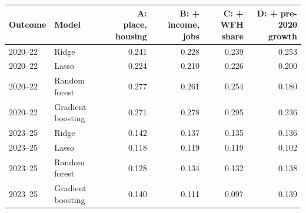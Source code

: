 \footnotesize\setlength{\tabcolsep}{4pt}
\begin{tabular}{llrrrr}
\toprule
Outcome & Model & \shortstack[r]{A: place,\\housing} & \shortstack[r]{B: + income,\\jobs} & \shortstack[r]{C: + WFH\\share} & \shortstack[r]{D: + pre-2020\\growth} \\
\midrule
2020--22 & Ridge & 0.241 & 0.228 & 0.239 & 0.253 \\
2020--22 & Lasso & 0.224 & 0.210 & 0.226 & 0.200 \\
2020--22 & Random forest & 0.277 & 0.261 & 0.254 & 0.180 \\
2020--22 & Gradient boosting & 0.271 & 0.278 & 0.295 & 0.236 \\
2023--25 & Ridge & 0.142 & 0.137 & 0.135 & 0.136 \\
2023--25 & Lasso & 0.118 & 0.119 & 0.119 & 0.102 \\
2023--25 & Random forest & 0.128 & 0.134 & 0.132 & 0.138 \\
2023--25 & Gradient boosting & 0.140 & 0.111 & 0.097 & 0.139 \\
\bottomrule
\end{tabular}
